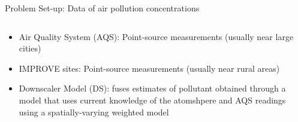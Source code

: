 \documentclass{beamer}
\begin{document}
\begin{frame}{Problem Set-up: Data of air pollution concentrations}
\begin{columns}
\begin{column}{6cm}
\vspace{-5mm}
\begin{itemize}
\item Air Quality System (AQS): Point-source measurements (usually near large cities)\vspace{3mm}
\item IMPROVE sites: Point-source measurements (usually near rural areas)\vspace{3mm}
\item Downscaler Model (DS): fuses estimates of pollutant obtained through a model that uses current knowledge of the atomshpere and AQS readings using a spatially-varying weighted model
\end{itemize}


\end{column}
\end{columns}
\end{frame}
\end{document}
